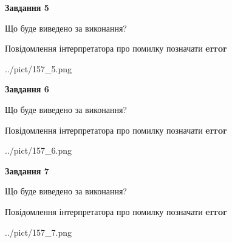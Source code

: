 \documentclass[10pt, ukrainian]{article}
\begin{document}
{\begin {large}
{\begin {center}\textbf{Завдання 5}\end {center}}\par
Що буде виведено за виконання? \par
Повідомлення інтерпретатора про помилку позначати \textbf{error}

\begin{center}
	{../pict/157_5.png}
\end{center}
\newpage

{\begin {center}\textbf{Завдання 6}\end {center}}\par
Що буде виведено за виконання? \par
Повідомлення інтерпретатора про помилку позначати \textbf{error}

\begin{center}
	{../pict/157_6.png}
\end{center}
\newpage

{\begin {center}\textbf{Завдання 7}\end {center}}\par
Що буде виведено за виконання? \par
Повідомлення інтерпретатора про помилку позначати \textbf{error}

\begin{center}
	{../pict/157_7.png}
\end{center}
\newpage

\end {large}}
\end{document}
